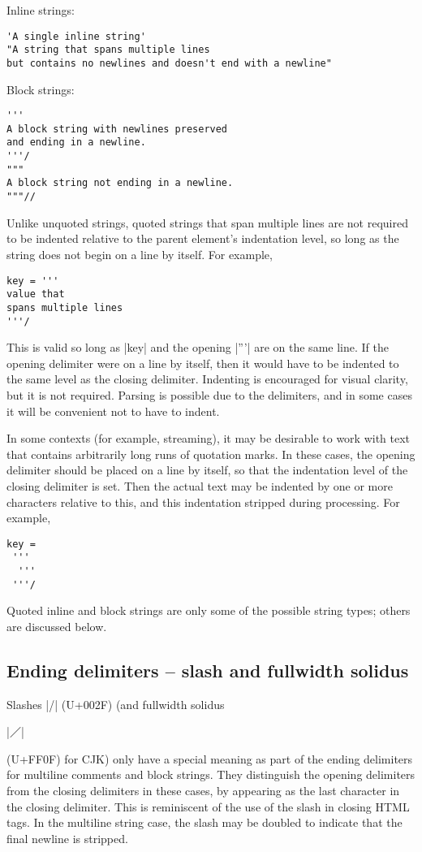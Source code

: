 \documentclass[11pt]{article}
\begin{document}
Inline strings:
\begin{Verbatim}
'A single inline string'
"A string that spans multiple lines
but contains no newlines and doesn't end with a newline"
\end{Verbatim}

Block strings:
\begin{Verbatim}
'''
A block string with newlines preserved
and ending in a newline.
'''/
"""
A block string not ending in a newline.
"""//
\end{Verbatim}

Unlike unquoted strings, quoted strings that span multiple lines are not required to be indented relative to the parent element's indentation level, so long as the string does not begin on a line by itself.  For example,
\begin{Verbatim}
key = '''
value that
spans multiple lines
'''/
\end{Verbatim}
This is valid so long as |key| and the opening |'''| are on the same line.  If the opening delimiter were on a line by itself, then it would have to be indented to the same level as the closing delimiter.  Indenting is encouraged for visual clarity, but it is not required.  Parsing is possible due to the delimiters, and in some cases it will be convenient not to have to indent.

In some contexts (for example, streaming), it may be desirable to work with text that contains arbitrarily long runs of quotation marks.  In these cases, the opening delimiter should be placed on a line by itself, so that the indentation level of the closing delimiter is set.  Then the actual text may be indented by one or more characters relative to this, and this indentation stripped during processing.  For example,
\begin{Verbatim}
key =
 '''
  '''
 '''/
\end{Verbatim}


Quoted inline and block strings are only some of the possible string types; others are discussed below.


\subsection{Ending delimiters -- slash and fullwidth solidus}

Slashes |/| (U+002F) (and fullwidth solidus \begin{CJK*}{UTF8}{gkai}|／|\end{CJK*} (U+FF0F) for CJK) only have a special meaning as part of the ending delimiters for multiline comments and block strings.  They distinguish the opening delimiters from the closing delimiters in these cases, by appearing as the last character in the closing delimiter.  This is reminiscent of the use of the slash in closing HTML tags.  In the multiline string case, the slash may be doubled to indicate that the final newline is stripped.
\end{document}
